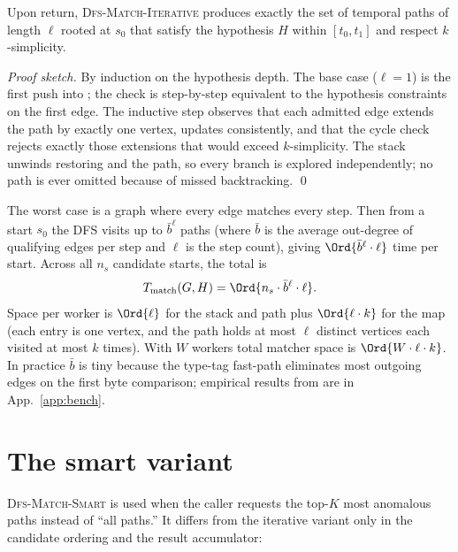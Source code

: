 \begin{theorem}
Upon return, \textsc{Dfs-Match-Iterative} produces exactly the set
of temporal paths of length $\ell$ rooted at $s_0$ that satisfy the
hypothesis $H$ within $[t_0, t_1]$ and respect $k$-simplicity.
\end{theorem}

\begin{proof}[Proof sketch]
By induction on the hypothesis depth. The base case ($\ell = 1$)
is the first push into ; the check is step-by-step
equivalent to the hypothesis constraints on the first edge. The
inductive step observes that each admitted edge extends the path by
exactly one vertex, updates  consistently, and that
the cycle check rejects exactly those extensions that would exceed
$k$-simplicity. The stack unwinds restoring  and the
path, so every branch is explored independently; no path is ever
omitted because of missed backtracking. \qed
\end{proof}

\begin{complexity}
The worst case is a graph where every edge matches every step.
Then from a start $s_0$ the DFS visits up to
$\bar{b}^\ell$ paths (where $\bar{b}$ is the average out-degree of
qualifying edges per step and $\ell$ is the step count), giving
$\Ord{\bar{b}^\ell \cdot \ell}$ time per start. Across all $n_s$
candidate starts, the total is
\[
    T_{\text{match}}(G, H) = \Ord{n_s \cdot \bar{b}^\ell \cdot \ell}.
\]
Space per worker is $\Ord{\ell}$ for the stack and path plus
$\Ord{\ell \cdot k}$ for the  map (each entry is one
vertex, and the path holds at most $\ell$ distinct vertices each
visited at most $k$ times). With $W$ workers total matcher space is
$\Ord{W \cdot \ell \cdot k}$. In practice $\bar{b}$ is tiny because
the type-tag fast-path eliminates most outgoing edges on the first
byte comparison; empirical results from 
are in App.~\ref{app:bench}.
\end{complexity}

\section{The smart variant}

\textsc{Dfs-Match-Smart} is used when the caller requests the
top-$K$ most anomalous paths instead of ``all paths.'' It differs
from the iterative variant only in the candidate ordering and the
result accumulator:

